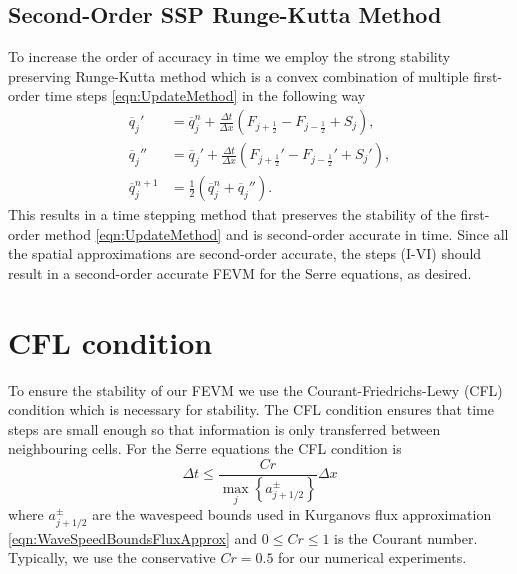 \subsection{Second-Order SSP Runge-Kutta Method}
To increase the order of accuracy in time we employ the strong stability preserving Runge-Kutta method \cite{Gottlieb-etal-2003-89} which is a convex combination of multiple first-order time steps \eqref{eqn:UpdateMethod} in the following way
\begin{subequations}
\begin{align}
\overline{q}_j' &= \overline{q}^{n}_j + \frac{\Delta t}{\Delta x} \left(F_{j+\frac{1}{2}} - F_{j-\frac{1}{2}} + S_j\right),\\
\overline{q}_j'' &= \overline{q}_j' + \frac{\Delta t}{\Delta x} \left(F_{j+\frac{1}{2}}' - F_{j-\frac{1}{2}}'  + S_j' \right), \\
\overline{q}^{n+1}_j &= \frac{1}{2} \left( \overline{q}^n_j +  \overline{q}_j'' \right).
\end{align}
\label{eqn:SSPRKStep1}
\end{subequations}
This results in a time stepping method that preserves the stability of the first-order method \eqref{eqn:UpdateMethod} and is second-order accurate in time. Since all the spatial approximations are second-order accurate, the steps (I-VI) should result in a second-order accurate FEVM for the Serre equations, as desired. 

\setcounter{subsection}{0}
\renewcommand{\thesubsection}{\thechapter.\arabic{section}.\arabic{subsection}} 

\section{CFL condition}
To ensure the stability of our FEVM we use the Courant-Friedrichs-Lewy (CFL) condition \cite{Courant-etal-1967-215} which is necessary for stability. The CFL condition ensures that time steps are small enough so that information is only transferred between neighbouring cells. For the Serre equations the CFL condition is 
\begin{equation}
\Delta t \le \frac{Cr }{\max_{j} \left\lbrace a^\pm_{j+1/2} \right\rbrace} \Delta x
\label{eqn:CFLcond}
\end{equation}
where $a^\pm_{j+1/2} $ are the wavespeed bounds used in Kurganovs flux approximation \eqref{eqn:WaveSpeedBoundsFluxApprox} and $0\le Cr \le 1$ is the Courant number. Typically, we use the conservative $Cr = 0.5$ for our numerical experiments. 

